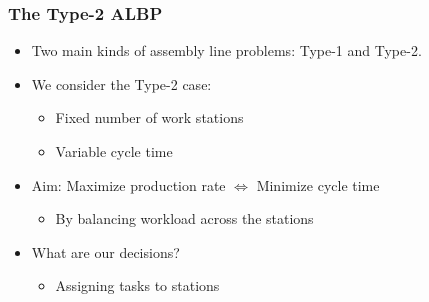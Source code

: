 \documentclass{beamer}
\begin{document}
\begin{frame}
\frametitle{The Type-2 ALBP}
\begin{itemize}
	\item Two main kinds of assembly line problems: Type-1 and Type-2.\vspace{3mm}\pause\\
	\item We consider the Type-2 case:\vspace{2mm}
	\begin{itemize}
		\item Fixed number of work stations\vspace{1mm}
		\item Variable cycle time\vspace{3mm}\pause
	\end{itemize}
	\item 
	{\color{red} Aim:} Maximize production rate $\iff$ Minimize cycle time\vspace{2mm}
	\begin{itemize}
		\item By balancing workload across the stations\vspace{3mm}\pause
	\end{itemize}
	\item What are our decisions?\vspace{2mm}
	\begin{itemize}
		\item Assigning tasks to stations
	\end{itemize}
\end{itemize}
\end{frame}
\end{document}
